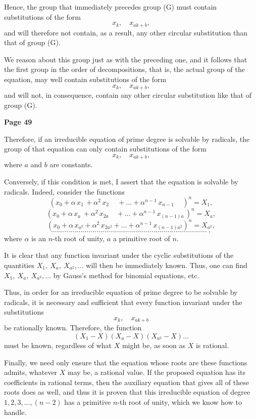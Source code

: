\documentclass{article}
\begin{document}
Hence, the group that immediately precedes group (G) must contain substitutions of the form
\[
x_k,\quad x_{a k + b},
\]
and will therefore not contain, as a result, any other circular substitution than that of group (G).

We reason about this group just as with the preceding one, and it follows that the first group in the order of decompositions, that is, the actual group of the equation, may well contain substitutions of the form
\[
x_k,\quad x_{a k + b},
\]
and will not, in consequence, contain any other circular substitution like that of group (G).

\bigskip

\textbf{Page 49}

Therefore, if an irreducible equation of prime degree is solvable by radicals, the group of that equation can only contain substitutions of the form
\[
x_k,\quad x_{a k + b},
\]
where $a$ and $b$ are constants.

Conversely, if this condition is met, I assert that the equation is solvable by radicals. Indeed, consider the functions
\[
(x_0 + \alpha\, x_1\, + \alpha^2\, x_2\,\quad + \dots + \alpha^{n-1}\, x_{n-1} \,\quad )^n = X_1,
\]
\[
(x_0 + \alpha\, x_a\, + \alpha^{2}\, x_{2a}\quad + \dots + \alpha^{n-1}\, x_{(n-1)a}\, )^n = X_a,
\]
\[
(x_0 + \alpha\, x_{a^2} + \alpha^2\, x_{2a^2} + \dots + \alpha^{n-1}\, x_{(n-1)a^2} )^n = X_{a^2},
\]
\[
...............................................................................\ ,
\]
where $\alpha$ is an $n$-th root of unity, $a$ a primitive root of $n$.

It is clear that any function invariant under the cyclic substitutions of the quantities $X_1,\ X_a,\ X_{a^2},\dots$ will then be immediately known. Thus, one can find $X_1,\ X_a,\ X_{a^2},\dots$ by Gauss’s method for binomial equations, etc.

Thus, in order for an irreducible equation of prime degree to be solvable by radicals, it is necessary and sufficient that every function invariant under the substitutions
\[
x_k,\quad x_{a k + b}
\]
be rationally known. Therefore, the function
\[
(X_1 - X)(X_{a} - X)(X_{a^2} - X)\dots
\]
must be known, regardless of what $X$ might be, as soon as $X$ is rational.

Finally, we need only ensure that the equation whose roots are these functions admits, whatever $X$ may be, a rational value. If the proposed equation has its coefficients in rational terms, then the auxiliary equation that gives all of these roots does as well, and thus it is proven that this irreducible equation of degree $1,2,3,\dots,(n-2)$ has a primitive $n$-th root of unity, which we know how to handle.
\end{document}
